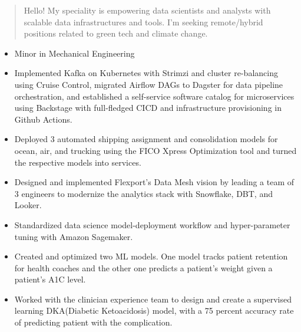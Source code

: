 \documentclass[10pt,a4paper,ragged2e,withhyper]{altacv}
\begin{document}
\begin{paracol}{2}
    \begin{quote}
        Hello! My speciality is empowering data scientists and analysts with scalable data infrastructures and tools. I'm seeking remote/hybrid positions related to green tech and climate change.
    \end{quote}
    \begin{itemize}
        \item Minor in Mechanical Engineering
    \end{itemize}
    \begin{itemize}
        \item Implemented Kafka on Kubernetes with Strimzi and cluster re-balancing using Cruise Control, migrated Airflow DAGs to Dagster for data pipeline orchestration, and established a self-service software catalog for microservices using Backstage with full-fledged CICD and infrastructure provisioning in Github Actions.
        \item Deployed 3 automated shipping assignment and consolidation models for ocean, air, and trucking using the FICO Xpress Optimization tool and turned the respective models into services.
        \item Designed and implemented Flexport's Data Mesh vision by leading a team of 3 engineers to modernize the analytics stack with Snowflake, DBT, and Looker.
    \end{itemize}
    \divider

    \begin{itemize}
        \item Standardized data science model-deployment workflow and hyper-parameter tuning with Amazon Sagemaker.
        \item Created and optimized two ML models. One model tracks patient retention for health coaches and the other one predicts a patient’s weight given a patient’s A1C level.
        \item Worked with the clinician experience team to design and create a supervised learning DKA(Diabetic Ketoacidosis) model, with a 75 percent accuracy rate of predicting patient with the complication.
    \end{itemize}
\end{paracol}
\end{document}
